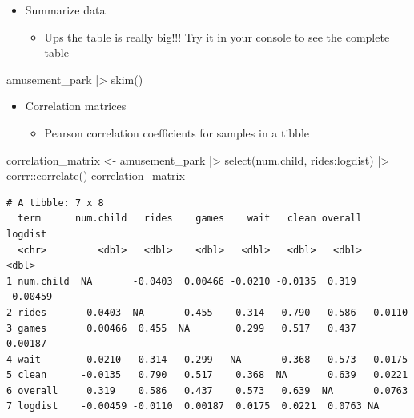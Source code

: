 \documentclass[
  ignorenonframetext,
]{beamer}
\newenvironment{Shaded}{\begin{snugshade}}{\end{snugshade}}
\newcommand{\FunctionTok}[1]{\textcolor[rgb]{0.28,0.35,0.67}{#1}}
\newcommand{\NormalTok}[1]{\textcolor[rgb]{0.00,0.23,0.31}{#1}}
\newcommand{\OtherTok}[1]{\textcolor[rgb]{0.00,0.23,0.31}{#1}}
\newcommand{\SpecialCharTok}[1]{\textcolor[rgb]{0.37,0.37,0.37}{#1}}
\providecommand{\tightlist}{%
  \setlength{\itemsep}{0pt}\setlength{\parskip}{0pt}}\usepackage{longtable,booktabs,array}
\begin{document}
\begin{frame}[fragile]{}
\label{section-5}
\begin{itemize}
\item
  Summarize data

  \begin{itemize}
  \tightlist
  \item
    Ups the table is really big!!! Try it in your console to see the
    complete table
  \end{itemize}
\end{itemize}

\tiny

\begin{Shaded}
\begin{Highlighting}[]
\NormalTok{amusement\_park }\SpecialCharTok{|\textgreater{}} \FunctionTok{skim}\NormalTok{()}
\end{Highlighting}
\end{Shaded}
\end{frame}

\begin{frame}[fragile]{}
\label{section-6}
\begin{itemize}
\item
  Correlation matrices

  \begin{itemize}
  \tightlist
  \item
    Pearson correlation coefficients for samples in a tibble
  \end{itemize}
\end{itemize}

\tiny

\begin{Shaded}
\begin{Highlighting}[]
\NormalTok{correlation\_matrix }\OtherTok{\textless{}{-}}\NormalTok{ amusement\_park }\SpecialCharTok{|\textgreater{}} 
  \FunctionTok{select}\NormalTok{(num.child, rides}\SpecialCharTok{:}\NormalTok{logdist) }\SpecialCharTok{|\textgreater{}}
\NormalTok{  corrr}\SpecialCharTok{::}\FunctionTok{correlate}\NormalTok{()}
\NormalTok{correlation\_matrix}
\end{Highlighting}
\end{Shaded}

\begin{verbatim}
# A tibble: 7 x 8
  term      num.child   rides    games    wait   clean overall  logdist
  <chr>         <dbl>   <dbl>    <dbl>   <dbl>   <dbl>   <dbl>    <dbl>
1 num.child  NA       -0.0403  0.00466 -0.0210 -0.0135  0.319  -0.00459
2 rides      -0.0403  NA       0.455    0.314   0.790   0.586  -0.0110 
3 games       0.00466  0.455  NA        0.299   0.517   0.437   0.00187
4 wait       -0.0210   0.314   0.299   NA       0.368   0.573   0.0175 
5 clean      -0.0135   0.790   0.517    0.368  NA       0.639   0.0221 
6 overall     0.319    0.586   0.437    0.573   0.639  NA       0.0763 
7 logdist    -0.00459 -0.0110  0.00187  0.0175  0.0221  0.0763 NA      
\end{verbatim}
\end{frame}
\end{document}
